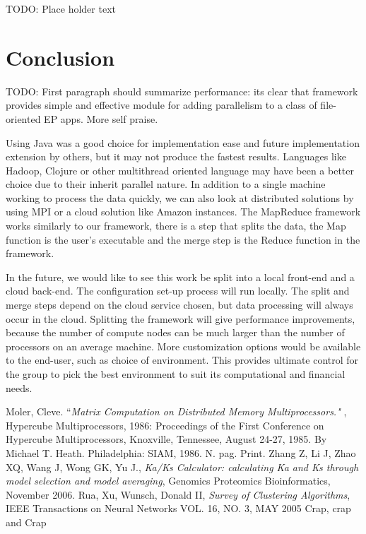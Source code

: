 \documentclass[12pt]{article}
\begin{document}
TODO: Place holder text

\section{Conclusion}

TODO: First paragraph should summarize performance: its clear that framework
provides simple and effective module for adding parallelism to a class of
file-oriented EP apps. More self praise.

Using Java was a good choice for implementation ease and future implementation
extension by others, but it may not produce the fastest results. Languages like
Hadoop, Clojure or other multithread oriented language may have been a better
choice due to their inherit parallel nature. In addition to a single machine
working to process the data quickly, we can also look at distributed solutions
by using MPI or a cloud solution like Amazon instances. The MapReduce framework
works similarly to our framework, there is a step that splits the data, the Map
function is the user's executable and the merge step is the Reduce function in
the framework. 

In the future, we would like to see this work be split into a local front-end
and a cloud back-end. The configuration set-up process will run locally. The
split and merge steps depend on the cloud service chosen, but data processing
will always occur in the cloud. Splitting the framework will give performance
improvements, because the number of compute nodes can be much larger than the
number of processors on an average machine. More customization options would be
available to the end-user, such as choice of environment. This provides ultimate
control for the group to pick the best environment to suit its computational and
financial needs.

\begin{thebibliography}{1}
Moler, Cleve. ``\emph{Matrix Computation on Distributed Memory Multiprocessors."
}, Hypercube Multiprocessors, 1986: Proceedings of the First Conference on
Hypercube Multiprocessors, Knoxville, Tennessee, August 24-27, 1985. By Michael
T. Heath. Philadelphia: SIAM, 1986. N. pag. Print.
Zhang Z, Li J, Zhao XQ, Wang J, Wong GK, Yu J., \emph{Ka/Ks Calculator: 
calculating Ka and Ks through model selection and model averaging},
Genomics Proteomics Bioinformatics, November 2006.
Rua, Xu, Wunsch, Donald II, \emph{Survey of Clustering Algorithms},
IEEE Transactions on Neural Networks VOL. 16, NO. 3, MAY 2005
Crap, crap and Crap
\end{thebibliography}
\end{document}
